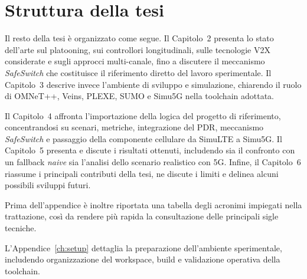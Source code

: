 \section{Struttura della tesi}

Il resto della tesi è organizzato come segue. Il Capitolo~2 presenta lo stato dell’arte sul platooning, sui controllori longitudinali, sulle tecnologie V2X considerate e sugli approcci multi-canale, fino a discutere il meccanismo \emph{SafeSwitch} che costituisce il riferimento diretto del lavoro sperimentale. Il Capitolo~3 descrive invece l’ambiente di sviluppo e simulazione, chiarendo il ruolo di OMNeT++, Veins, PLEXE, SUMO e Simu5G nella toolchain adottata.

Il Capitolo~4 affronta l’importazione della logica del progetto di riferimento, concentrandosi su scenari, metriche, integrazione del PDR, meccanismo \emph{SafeSwitch} e passaggio della componente cellulare da SimuLTE a Simu5G. Il Capitolo~5 presenta e discute i risultati ottenuti, includendo sia il confronto con un fallback \emph{naive} sia l’analisi dello scenario realistico con 5G. Infine, il Capitolo~6 riassume i principali contributi della tesi, ne discute i limiti e delinea alcuni possibili sviluppi futuri.

Prima dell’appendice è inoltre riportata una tabella degli acronimi impiegati nella trattazione, così da rendere più rapida la consultazione delle principali sigle tecniche.

L’Appendice~\ref{ch:setup} dettaglia la preparazione dell’ambiente sperimentale, includendo organizzazione del workspace, build e validazione operativa della toolchain.
